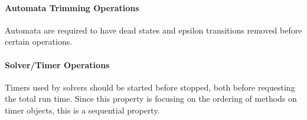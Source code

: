 \documentclass[letterpaper,11pt,twocolumn]{article}
\begin{document}
\paragraph{Automata Trimming Operations} Automata are required to have dead states and epsilon
transitions removed before certain operations.

\paragraph{Solver/Timer Operations} Timers used by solvers should be started before stopped,
both before requesting the total run time.  Since this property is focusing on
the ordering of methods on timer objects, this is a sequential property.

\nocite{*}


\end{document}

